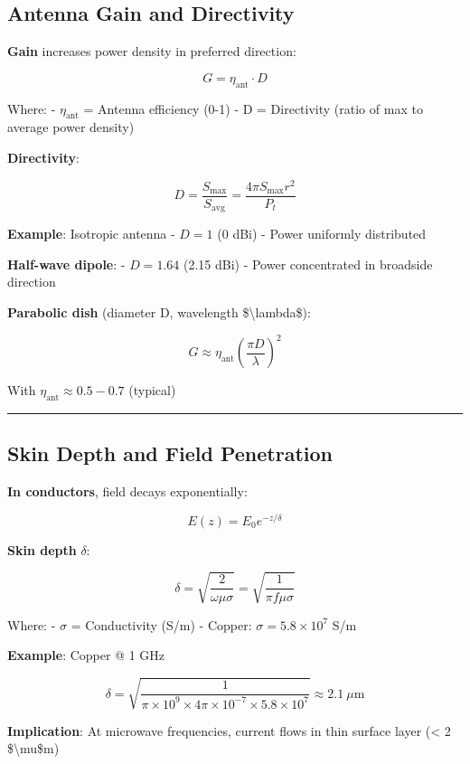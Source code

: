 \subsection{Antenna Gain and
Directivity}\label{antenna-gain-and-directivity}

\textbf{Gain} increases power density in preferred direction:

\[
G = \eta_{\text{ant}} \cdot D
\]

Where: - \(\eta_{\text{ant}}\) = Antenna efficiency (0-1) - D =
Directivity (ratio of max to average power density)

\textbf{Directivity}:

\[
D = \frac{S_{\text{max}}}{S_{\text{avg}}} = \frac{4\pi S_{\text{max}} r^2}{P_t}
\]

\textbf{Example}: Isotropic antenna - \(D = 1\) (0 dBi) - Power
uniformly distributed

\textbf{Half-wave dipole}: - \(D = 1.64\) (2.15 dBi) - Power
concentrated in broadside direction

\textbf{Parabolic dish} (diameter D, wavelength
\$\textbackslash lambda\$):

\[
G \approx \eta_{\text{ant}} \left(\frac{\pi D}{\lambda}\right)^2
\]

With \(\eta_{\text{ant}} \approx 0.5-0.7\) (typical)

\begin{center}\rule{0.5\linewidth}{0.5pt}\end{center}

\subsection{Skin Depth and Field
Penetration}\label{skin-depth-and-field-penetration}

\textbf{In conductors}, field decays exponentially:

\[
E(z) = E_0 e^{-z/\delta}
\]

\textbf{Skin depth} \(\delta\):

\[
\delta = \sqrt{\frac{2}{\omega \mu \sigma}} = \sqrt{\frac{1}{\pi f \mu \sigma}}
\]

Where: - \(\sigma\) = Conductivity (S/m) - Copper:
\(\sigma = 5.8 \times 10^7\) S/m

\textbf{Example}: Copper @ 1 GHz

\[
\delta = \sqrt{\frac{1}{\pi \times 10^9 \times 4\pi \times 10^{-7} \times 5.8 \times 10^7}} \approx 2.1\ \mu\text{m}
\]

\textbf{Implication}: At microwave frequencies, current flows in thin
surface layer (\textless{} 2 \$\textbackslash mu\$m)

